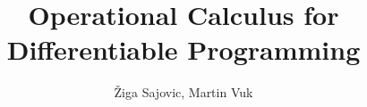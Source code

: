 
\title{Operational Calculus for Differentiable Programming}

\author{\v{Z}iga Sajovic, Martin Vuk}



\maketitle










\printbibliography

  
